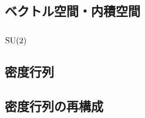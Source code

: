 \documentclass{report}
\begin{document}
  \subsection{ベクトル空間・内積空間}
  \subsection{$\mathrm{SU}(2)$}
  \subsection{密度行列}
  \subsection{密度行列の再構成}
\end{document}

